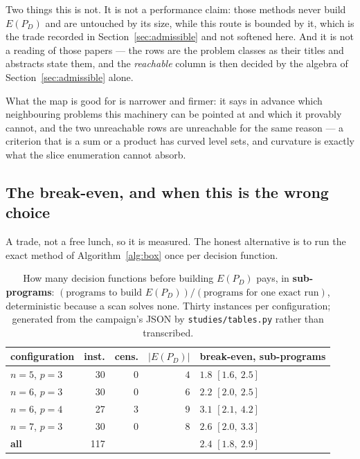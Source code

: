 \documentclass[11pt,a4paper]{article}
\newcommand{\Dset}{D}
\newcommand{\E}{E(P_{\Dset})}
\begin{document}
Two things this is not.  It is not a performance claim: those methods never
build $\E$ and are untouched by its size, while this route is bounded by it,
which is the trade recorded in Section~\ref{sec:admissible} and not softened
here.  And it is not a reading of those papers --- the rows are the problem
classes as their titles and abstracts state them, and the \emph{reachable}
column is then decided by the algebra of Section~\ref{sec:admissible} alone.

What the map is good for is narrower and firmer: it says in advance which
neighbouring problems this machinery can be pointed at and which it provably
cannot, and the two unreachable rows are unreachable for the same reason --- a
criterion that is a sum or a product has curved level sets, and curvature is
exactly what the slice enumeration cannot absorb.

\subsection{The break-even, and when this is the wrong choice}

A trade, not a free lunch, so it is measured.  The honest alternative is to run
the exact method of Algorithm~\ref{alg:box} once per decision function.

\begin{table}[h]
\centering
\caption{How many decision functions before building $\E$ pays, in
\textbf{sub-programs}: $(\text{programs to build }\E)/(\text{programs for one
exact run})$, deterministic because a scan solves none.  Thirty instances per
configuration; generated from the campaign's JSON by
\texttt{studies/tables.py} rather than transcribed.}
\begin{tabular}{lrrrl}
\toprule
configuration & inst. & cens. & $|\E|$ & break-even, sub-programs \\
\midrule
$n=5$, $p=3$ & 30 & 0 & $4$ & $\mathbf{1.8}$ $[1.6,\ 2.5]$ \\
$n=6$, $p=3$ & 30 & 0 & $6$ & $\mathbf{2.2}$ $[2.0,\ 2.5]$ \\
$n=6$, $p=4$ & 27 & 3 & $9$ & $\mathbf{3.1}$ $[2.1,\ 4.2]$ \\
$n=7$, $p=3$ & 30 & 0 & $8$ & $\mathbf{2.6}$ $[2.0,\ 3.3]$ \\
\midrule
\textbf{all} & 117 & & & $\mathbf{2.4}$ $[1.8,\ 2.9]$ \\
\bottomrule
\end{tabular}
\end{table}
\end{document}
